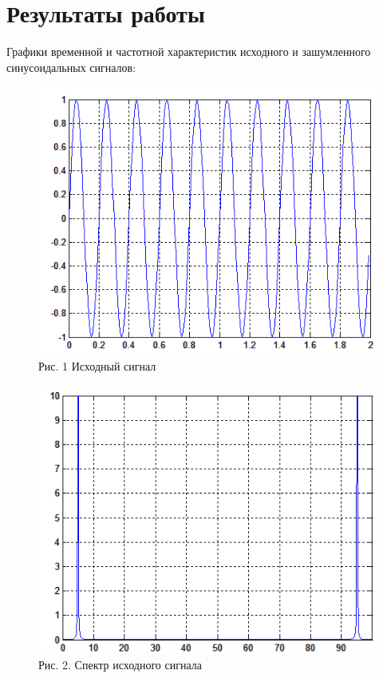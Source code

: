 \documentclass[10pt,a4paper]{report}
\begin{document}
\section{Результаты работы}
Графики временной и частотной характеристик исходного и зашумленного синусоидальных сигналов:
\begin{figure}
\begin{center}
\includegraphics[angle=0, scale = 1]{pic1.png}\newline
Рис. 1 Исходный сигнал\newline
\end{center}
\begin{center}
\includegraphics[angle=0, scale = 1]{pic2.png}\newline
Рис. 2. Спектр исходного сигнала\newline
\end{center}
\end{figure}
\end{document}
